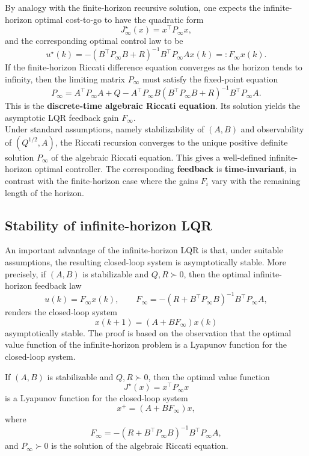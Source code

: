 By analogy with the finite-horizon recursive solution, one expects the infinite-horizon optimal cost-to-go to have the quadratic form
\[
J_\infty^\star(x)=x^\top P_\infty x,
\]
and the corresponding optimal control law to be
\[
u^\star(k)
=
-(B^\top P_\infty B + R)^{-1}B^\top P_\infty A x(k)
=:F_\infty x(k).
\]
If the finite-horizon Riccati difference equation converges as the horizon tends to infinity, then the limiting matrix $P_\infty$ must satisfy the fixed-point equation
\[
P_\infty
=
A^\top P_\infty A + Q
-
A^\top P_\infty B(B^\top P_\infty B + R)^{-1}B^\top P_\infty A.
\]
This is the \textbf{discrete-time algebraic Riccati equation}. Its solution yields the asymptotic LQR feedback gain $F_\infty$.\\
Under standard assumptions, namely stabilizability of $(A,B)$ and observability of $(Q^{1/2},A)$, the Riccati recursion converges to the unique positive definite solution $P_\infty$ of the algebraic Riccati equation. This gives a well-defined infinite-horizon optimal controller. The corresponding \textbf{feedback} is \textbf{time-invariant}, in contrast with the finite-horizon case where the gains $F_i$ vary with the remaining length of the horizon. 
\subsection{Stability of infinite-horizon LQR}

An important advantage of the infinite-horizon LQR is that, under suitable assumptions, the resulting closed-loop system is asymptotically stable. More precisely, if $(A,B)$ is stabilizable and $Q,R \succ 0$, then the optimal infinite-horizon feedback law
\[
u(k)=F_\infty x(k),
\qquad
F_\infty = -(R+B^\top P_\infty B)^{-1}B^\top P_\infty A,
\]
renders the closed-loop system
\[
x(k+1)=(A+BF_\infty)x(k)
\]
asymptotically stable. The proof is based on the observation that the optimal value function of the infinite-horizon problem is a Lyapunov function for the closed-loop system.

\begin{theorembox}
If $(A,B)$ is stabilizable and $Q,R \succ 0$, then the optimal value function
\[
J^\star(x)=x^\top P_\infty x
\]
is a Lyapunov function for the closed-loop system
\[
x^+=(A+BF_\infty)x,
\]
where
\[
F_\infty = -(R+B^\top P_\infty B)^{-1}B^\top P_\infty A,
\]
and $P_\infty \succ 0$ is the solution of the algebraic Riccati equation.
\end{theorembox}

